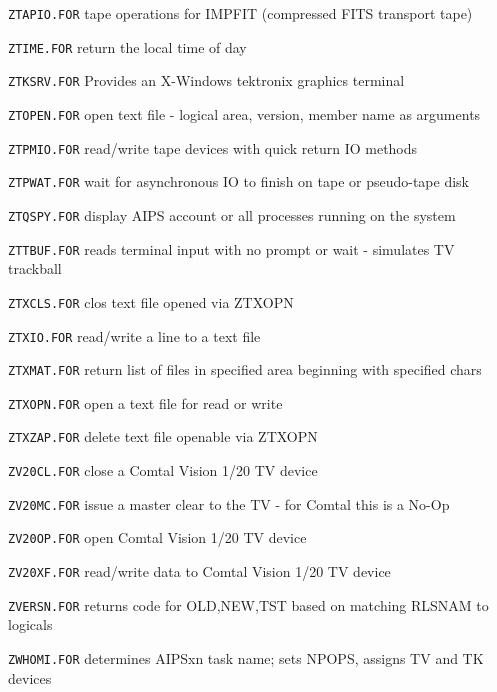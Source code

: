 {\item{\tt ZTAPIO.FOR} tape operations for IMPFIT (compressed FITS transport tape)
\item{\tt ZTIME.FOR} return the local time of day
\item{\tt ZTKSRV.FOR} Provides an X-Windows tektronix graphics terminal
\item{\tt ZTOPEN.FOR} open text file - logical area, version, member name as arguments
\item{\tt ZTPMIO.FOR} read/write tape devices with quick return IO methods
\item{\tt ZTPWAT.FOR} wait for asynchronous IO to finish on tape or pseudo-tape disk
\item{\tt ZTQSPY.FOR} display AIPS account or all processes running on the system
\item{\tt ZTTBUF.FOR} reads terminal input with no prompt or wait - simulates TV trackball
\item{\tt ZTXCLS.FOR} clos text file opened via ZTXOPN
\item{\tt ZTXIO.FOR} read/write a line to a text file
\item{\tt ZTXMAT.FOR} return list of files in specified area beginning with specified chars
\item{\tt ZTXOPN.FOR} open a text file for read or write
\item{\tt ZTXZAP.FOR} delete text file openable via ZTXOPN
\item{\tt ZV20CL.FOR} close a Comtal Vision 1/20 TV device
\item{\tt ZV20MC.FOR} issue a master clear to the TV - for Comtal this is a No-Op
\item{\tt ZV20OP.FOR} open Comtal Vision 1/20 TV device
\item{\tt ZV20XF.FOR} read/write data to Comtal Vision 1/20 TV device
\item{\tt ZVERSN.FOR} returns code for OLD,NEW,TST based on matching RLSNAM to logicals
\item{\tt ZWHOMI.FOR} determines AIPSxn task name; sets NPOPS, assigns TV and TK devices

\medskip

}
